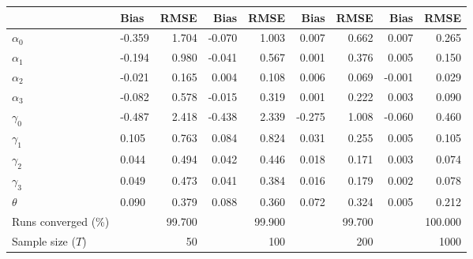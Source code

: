 
\begin{tabular}[t]{llrrrrrrr}
\toprule
  & Bias & RMSE & Bias & RMSE & Bias & RMSE & Bias & RMSE\\
\midrule
$\alpha_{0}$ & -0.359 & 1.704 & -0.070 & 1.003 & 0.007 & 0.662 & 0.007 & 0.265\\
$\alpha_{1}$ & -0.194 & 0.980 & -0.041 & 0.567 & 0.001 & 0.376 & 0.005 & 0.150\\
$\alpha_{2}$ & -0.021 & 0.165 & 0.004 & 0.108 & 0.006 & 0.069 & -0.001 & 0.029\\
$\alpha_{3}$ & -0.082 & 0.578 & -0.015 & 0.319 & 0.001 & 0.222 & 0.003 & 0.090\\
$\gamma_{0}$ & -0.487 & 2.418 & -0.438 & 2.339 & -0.275 & 1.008 & -0.060 & 0.460\\
$\gamma_{1}$ & 0.105 & 0.763 & 0.084 & 0.824 & 0.031 & 0.255 & 0.005 & 0.105\\
$\gamma_{2}$ & 0.044 & 0.494 & 0.042 & 0.446 & 0.018 & 0.171 & 0.003 & 0.074\\
$\gamma_{3}$ & 0.049 & 0.473 & 0.041 & 0.384 & 0.016 & 0.179 & 0.002 & 0.078\\
$\theta$ & 0.090 & 0.379 & 0.088 & 0.360 & 0.072 & 0.324 & 0.005 & 0.212\\
Runs converged (\%) &  & 99.700 &  & 99.900 &  & 99.700 &  & 100.000\\
Sample size ($T$) &  & 50 &  & 100 &  & 200 &  & 1000\\
\bottomrule
\end{tabular}
